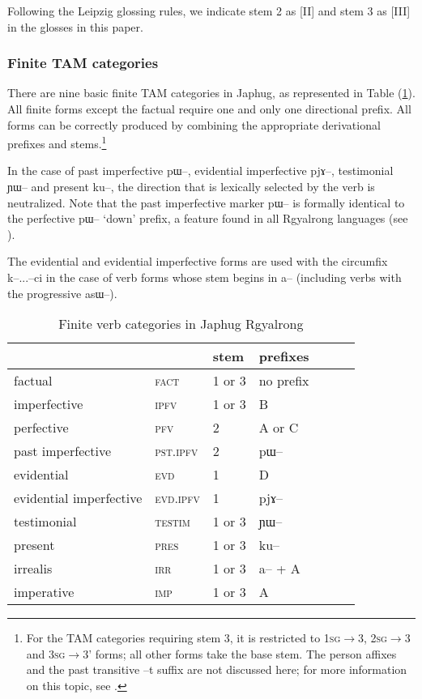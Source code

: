 \documentclass[oldfontcommands,oneside,a4paper,11pt]{article}
\newcommand{\ipa}[1]{{\phon \mbox{#1}}} %
\newcommand{\refb}[1]{(\ref{#1})}
\begin{document}
Following the Leipzig glossing rules, we indicate stem 2 as [II] and stem 3 as [III] in the glosses in this paper.
\subsubsection{Finite TAM categories} \label{sec:finite.TAM}

There are nine basic finite TAM categories in Japhug, as represented in Table \refb{tab:finite.forms}. All finite forms except the factual require one and only one directional prefix. All forms can be correctly produced by combining the appropriate derivational prefixes and stems.\footnote{For the TAM categories requiring stem 3, it is restricted to  \textsc{1sg}$\rightarrow$3, \textsc{2sg}$\rightarrow$3 and \textsc{3sg}$\rightarrow$3' forms; all other forms take the base stem.  The person affixes and the past transitive \ipa{--t} suffix are not discussed here; for  more information on this topic, see \citet{jacques10inverse}.}


In the case of past imperfective \ipa{pɯ--}, evidential imperfective \ipa{pjɤ--}, testimonial \ipa{ɲɯ--} and present \ipa{ku--}, the direction that is lexically selected by the verb is neutralized. Note that the past imperfective marker \ipa{pɯ--} is formally identical to the perfective \ipa{pɯ--} `down' prefix, a feature found in all Rgyalrong languages (see \citealt{lin11direction}).

The evidential and evidential imperfective forms are used with the circumfix \ipa{k--}...\ipa{--ci} in the case of verb forms whose stem begins in \ipa{a--} (including verbs with the progressive \ipa{asɯ--}).

\begin{table}
\caption{Finite verb categories in Japhug Rgyalrong} \label{tab:finite.forms} \centering
\begin{tabular}{lllllll}
\toprule
&	&	stem&	prefixes\\
\midrule
factual&	\textsc{fact} &	1 or 3&	no prefix\\
imperfective&	\textsc{ipfv} &	1 or 3&	B\\
perfective&	\textsc{pfv} &	2&	A or C\\
past imperfective&	\textsc{pst.ipfv} &	2&	\ipa{pɯ--}\\
evidential&	\textsc{evd} &	1&	D\\
evidential imperfective&	\textsc{evd.ipfv} &	1&	\ipa{pjɤ--}\\
testimonial&	\textsc{testim} &	1 or 3&	\ipa{ɲɯ--}\\
present&	\textsc{pres} &	1 or 3&	\ipa{ku--}\\
irrealis&	\textsc{irr} &	1 or 3&	\ipa{a--} + A\\
imperative&	\textsc{imp} &	1 or 3&	A\\
\bottomrule
\end{tabular}
\end{table}
\end{document}
